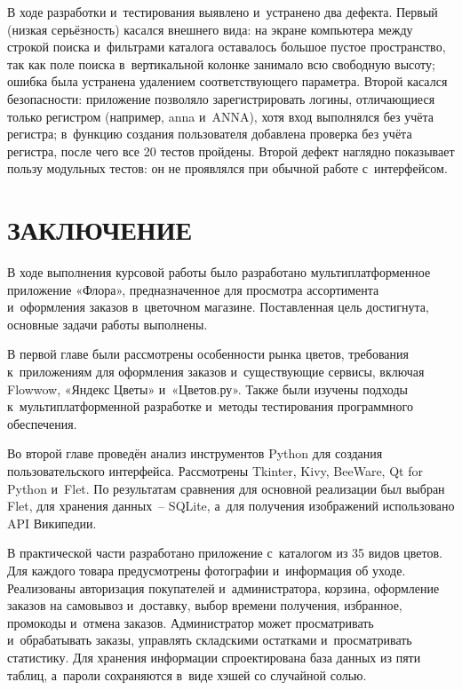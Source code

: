 \documentclass[14pt,a4paper]{extarticle}
\begin{document}
В ходе разработки и~тестирования выявлено и~устранено два дефекта. Первый (низкая серьёзность) касался внешнего вида: на экране компьютера между строкой поиска и~фильтрами каталога оставалось большое пустое пространство, так как поле поиска в~вертикальной колонке занимало всю свободную высоту; ошибка была устранена удалением соответствующего параметра. Второй касался безопасности: приложение позволяло зарегистрировать логины, отличающиеся только регистром (например, anna и~ANNA), хотя вход выполнялся без учёта регистра; в~функцию создания пользователя добавлена проверка без учёта регистра, после чего все 20 тестов пройдены. Второй дефект наглядно показывает пользу модульных тестов: он не проявлялся при обычной работе с~интерфейсом.



\clearpage

\section*{ЗАКЛЮЧЕНИЕ}

В ходе выполнения курсовой работы было разработано мультиплатформенное приложение «Флора», предназначенное для просмотра ассортимента и~оформления заказов в~цветочном магазине. Поставленная цель достигнута, основные задачи работы выполнены.



В первой главе были рассмотрены особенности рынка цветов, требования к~приложениям для оформления заказов и~существующие сервисы, включая Flowwow, «Яндекс Цветы» и~«Цветов.ру». Также были изучены подходы к~мультиплатформенной разработке и~методы тестирования программного обеспечения.



Во второй главе проведён анализ инструментов Python для создания пользовательского интерфейса. Рассмотрены Tkinter, Kivy, BeeWare, Qt for Python и~Flet. По результатам сравнения для основной реализации был выбран Flet, для хранения данных~– SQLite, а~для получения изображений использовано API Википедии.



В практической части разработано приложение с~каталогом из 35 видов цветов. Для каждого товара предусмотрены фотографии и~информация об уходе. Реализованы авторизация покупателей и~администратора, корзина, оформление заказов на самовывоз и~доставку, выбор времени получения, избранное, промокоды и~отмена заказов. Администратор может просматривать и~обрабатывать заказы, управлять складскими остатками и~просматривать статистику. Для хранения информации спроектирована база данных из пяти таблиц, а~пароли сохраняются в~виде хэшей со случайной солью.
\end{document}
